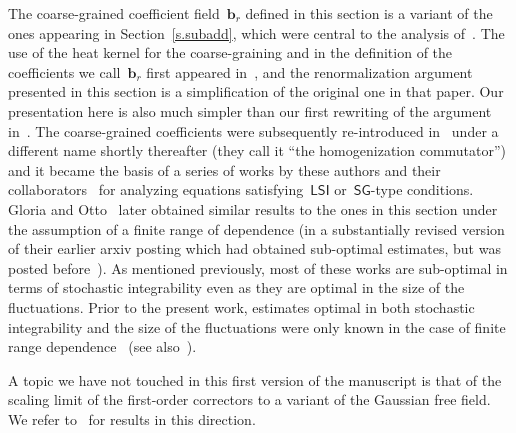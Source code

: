 \documentclass[11pt]{article} %
\numberwithin{equation}{section}
\theoremstyle{definition}
\renewcommand{\b}{\ensuremath{\mathbf{b}}}
\newcommand{\LSI}{\mathsf{LSI}}
\newcommand{\SG}{\mathsf{SG}}
\begin{document}
The coarse-grained coefficient field~$\b_r$ defined in this section is a variant of the ones appearing in Section~\ref{s.subadd}, which were central to the analysis of~\cite{AS,AM,AKM1}. The use of the heat kernel for the coarse-graining and in the definition of the coefficients we call~$\b_r$ first appeared in~\cite{AKM}, and the renormalization argument presented in this section is a simplification of the original one in that paper. Our presentation here is also much simpler than our first rewriting of the argument in~\cite[Chapter 4]{AKMBook}.
The coarse-grained coefficients were subsequently re-introduced in~\cite{DGO} under a different name shortly thereafter (they call it ``the homogenization commutator'') and it became the basis of a series of works by these authors and their collaborators~\cite{DGO2,DFG} for analyzing equations satisfying~$\LSI$ or~$\SG$-type conditions. Gloria and Otto~\cite{GO6} later obtained similar results to the ones in this section under the assumption of a finite range of dependence (in a substantially revised version of their earlier arxiv posting which had obtained sub-optimal estimates, but was posted before~\cite{AKM}). 
As mentioned previously, most of these works are sub-optimal in terms of stochastic integrability even as they are optimal in the size of the fluctuations. 
Prior to the present work, estimates optimal in both stochastic integrability and the size of the fluctuations were only known in the case of finite range dependence~\cite{AKM,GO6} (see also~\cite{Fischer}). 

\smallskip

A topic we have not touched in this first version of the manuscript is that of the scaling limit of the first-order correctors to a variant of the Gaussian free field. We refer to~\cite{AKM,GO6,DGO} for results in this direction. 
 
 
{\small


}
\end{document}
